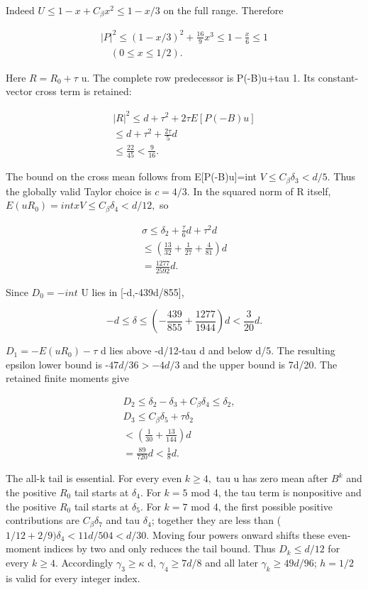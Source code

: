 Indeed \(U\le 1-x+C_\beta x^2\le 1-x/3\) on the full range. Therefore

\[
\begin{gathered}
|P|^2\le(1-x/3)^2+\frac{16}{9}x^3\le1-\frac x6\le1\\
\quad(0\le x\le1/2).
\end{gathered}\tag{R29.6.3}
\]

Here \(R=R_0+\tau\) u. The complete row predecessor is P(-B)u+tau 1.
Its constant-vector cross term is retained:

\[
\begin{gathered}
|R|^2\le d+\tau^2+2\tau E[P(-B)u]\\
\le d+\tau^2+\frac{2\tau}{5}d\\
\le\frac{22}{45}<\frac9{16}.
\end{gathered}\tag{R29.6.4}
\]

The bound on the cross mean follows from
E[P(-B)u]=int \(V\le C_\beta \delta_3<d/5.\) Thus the globally valid
Taylor choice is \(c=4/3.\) In the squared norm of R itself,
\(E(uR_0)=int xV\le C_\beta \delta_4<d/12,\allowbreak \) so

\[
\begin{gathered}
\sigma\le \delta_2+\frac{\tau}{6}d+\tau^2d\\
\le\left(\frac{13}{32}+\frac1{27}+\frac4{81}\right)d\\
=\frac{1277}{2592}d.
\end{gathered}\tag{R29.6.5}
\]

Since \(D_0=-int\) U lies in [-d,-439d/855],

\[
-d\le\delta\le
\left(-\frac{439}{855}+\frac{1277}{1944}\right)d
<\frac3{20}d.
\]

\(D_1=-E(uR_0)-\tau\) d lies above -d/12-tau d and below d/5.
The resulting epsilon lower bound is -\(47d/36>-4d/3\) and
the upper bound is 7d/20. The retained finite moments give

\[
\begin{gathered}
D_2\le \delta_2-\delta_3+C_\beta \delta_4\le \delta_2,\quad\\
D_3\le C_\beta \delta_5+\tau \delta_2\\
<\left(\frac1{30}+\frac{13}{144}\right)d\\
=\frac{89}{720}d<\frac18d.
\end{gathered}
\]

The all-k tail is essential. For every even \(k\ge 4,\allowbreak \) tau u has zero
mean after \(B^k\) and the positive \(R_0\) tail starts at \(\delta_4.\) For \(k=5\) mod 4,
the tau term is nonpositive and the positive \(R_0\) tail starts at \(\delta_5.\)
For \(k=7\) mod 4, the first possible positive contributions are
\(C_\beta \delta_7\) and tau \(\delta_4\); together they are less than
(\(1/12+2/9)\delta_4<11d/504<d/30.\) Moving four powers onward shifts
these even-moment indices by two and only reduces the tail bound.
Thus \(D_k\le d/12\) for every \(k\ge 4.\) Accordingly
\(\gamma_3\ge \kappa\) d, \(\gamma_4\ge 7d/8\) and all later \(\gamma_k\ge 49d/96\);
\(h=1/2\) is valid for every integer index.

